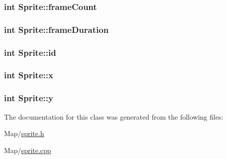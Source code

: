 \subsubsection[{\texorpdfstring{frame\+Count}{frameCount}}]{\setlength{\rightskip}{0pt plus 5cm}int Sprite\+::frame\+Count\hspace{0.3cm}{\ttfamily [protected]}}\hypertarget{classSprite_a8dc8d5c9530bad6113d37fe5e53e4668}{}\label{classSprite_a8dc8d5c9530bad6113d37fe5e53e4668}
\subsubsection[{\texorpdfstring{frame\+Duration}{frameDuration}}]{\setlength{\rightskip}{0pt plus 5cm}int Sprite\+::frame\+Duration\hspace{0.3cm}{\ttfamily [protected]}}\hypertarget{classSprite_afccc80a82c0a1c2cbc80edfbe1ca5c18}{}\label{classSprite_afccc80a82c0a1c2cbc80edfbe1ca5c18}
\subsubsection[{\texorpdfstring{id}{id}}]{\setlength{\rightskip}{0pt plus 5cm}int Sprite\+::id\hspace{0.3cm}{\ttfamily [protected]}}\hypertarget{classSprite_a173701f829c18e742a363f3b9780ac06}{}\label{classSprite_a173701f829c18e742a363f3b9780ac06}
\subsubsection[{\texorpdfstring{x}{x}}]{\setlength{\rightskip}{0pt plus 5cm}int Sprite\+::x\hspace{0.3cm}{\ttfamily [protected]}}\hypertarget{classSprite_ab36028dcefdd4bf024c52c8d9519a283}{}\label{classSprite_ab36028dcefdd4bf024c52c8d9519a283}
\subsubsection[{\texorpdfstring{y}{y}}]{\setlength{\rightskip}{0pt plus 5cm}int Sprite\+::y\hspace{0.3cm}{\ttfamily [protected]}}\hypertarget{classSprite_a363e26017ee2aaed8636f7dab92af2cd}{}\label{classSprite_a363e26017ee2aaed8636f7dab92af2cd}


The documentation for this class was generated from the following files\+:\begin{DoxyCompactItemize}
\item 
Map/\hyperlink{sprite_8h}{sprite.\+h}\item 
Map/\hyperlink{sprite_8cpp}{sprite.\+cpp}\end{DoxyCompactItemize}
